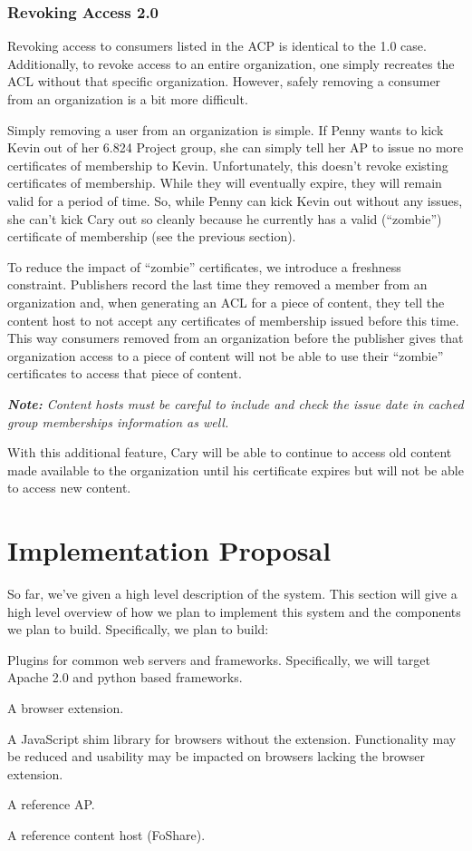 \documentclass[pdftex,12pt,a4papaer]{article}
\newcommand{\note}[1]{\textit{\textbf{Note:} #1}}
\begin{document}
\subsubsection{Revoking Access 2.0}

Revoking access to consumers listed in the ACP is identical to the 1.0 case.
Additionally, to revoke access to an entire organization, one simply recreates
the ACL without that specific organization. However, safely removing a consumer
from an organization is a bit more difficult.

Simply removing a user from an organization is simple. If Penny wants to kick
Kevin out of her 6.824 Project group, she can simply tell her AP to issue no
more certificates of membership to Kevin. Unfortunately, this doesn't revoke
existing certificates of membership. While they will eventually expire, they
will remain valid for a period of time. So, while Penny can kick Kevin out
without any issues, she can't kick Cary out so cleanly because he currently has
a valid (``zombie'') certificate of membership (see the previous section).

To reduce the impact of ``zombie'' certificates, we introduce a freshness
constraint. Publishers record the last time they removed a member from an
organization and, when generating an ACL for a piece of content, they tell the
content host to not accept any certificates of membership issued before this
time. This way consumers removed from an organization before the publisher
gives that organization access to a piece of content will not be able to use
their ``zombie'' certificates to access that piece of content.

\note{Content hosts must be careful to include and check the issue date in
cached group memberships information as well.}

With this additional feature, Cary  will be able to continue to access old
content made available to the organization until his certificate expires but
will not be able to access new content. 

\section{Implementation Proposal}

So far, we've given a high level description of the system. This section will
give a high level overview of how we plan to implement this system and the
components we plan to build. Specifically, we plan to build:

\begin{compactitem}
\item Plugins for common web servers and frameworks. Specifically, we will
    target Apache 2.0 and python based frameworks.
\item A browser extension.
\item A JavaScript shim library for browsers without the extension.
    Functionality may be reduced and usability may be impacted on browsers
    lacking the browser extension.
\item A reference AP.
\item A reference content host (FoShare).
\end{compactitem}
\end{document}
